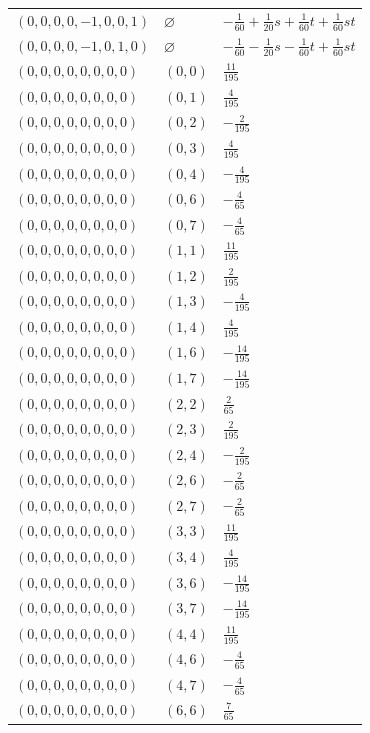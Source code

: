 \begin{longtable}{@{}lll@{}}
$(0,0,0,0,-1,0,0,1)$ & $\varnothing$ & $-\frac{1}{60}+\frac{1}{20}s+\frac{1}{60}t+\frac{1}{60}st$\\
$(0,0,0,0,-1,0,1,0)$ & $\varnothing$ & $-\frac{1}{60}-\frac{1}{20}s-\frac{1}{60}t+\frac{1}{60}st$\\
$(0,0,0,0,0,0,0,0)$ & $(0,0)$ & $\frac{11}{195}$\\
$(0,0,0,0,0,0,0,0)$ & $(0,1)$ & $\frac{4}{195}$\\
$(0,0,0,0,0,0,0,0)$ & $(0,2)$ & $-\frac{2}{195}$\\
$(0,0,0,0,0,0,0,0)$ & $(0,3)$ & $\frac{4}{195}$\\
$(0,0,0,0,0,0,0,0)$ & $(0,4)$ & $-\frac{4}{195}$\\
$(0,0,0,0,0,0,0,0)$ & $(0,6)$ & $-\frac{4}{65}$\\
$(0,0,0,0,0,0,0,0)$ & $(0,7)$ & $-\frac{4}{65}$\\
$(0,0,0,0,0,0,0,0)$ & $(1,1)$ & $\frac{11}{195}$\\
$(0,0,0,0,0,0,0,0)$ & $(1,2)$ & $\frac{2}{195}$\\
$(0,0,0,0,0,0,0,0)$ & $(1,3)$ & $-\frac{4}{195}$\\
$(0,0,0,0,0,0,0,0)$ & $(1,4)$ & $\frac{4}{195}$\\
$(0,0,0,0,0,0,0,0)$ & $(1,6)$ & $-\frac{14}{195}$\\
$(0,0,0,0,0,0,0,0)$ & $(1,7)$ & $-\frac{14}{195}$\\
$(0,0,0,0,0,0,0,0)$ & $(2,2)$ & $\frac{2}{65}$\\
$(0,0,0,0,0,0,0,0)$ & $(2,3)$ & $\frac{2}{195}$\\
$(0,0,0,0,0,0,0,0)$ & $(2,4)$ & $-\frac{2}{195}$\\
$(0,0,0,0,0,0,0,0)$ & $(2,6)$ & $-\frac{2}{65}$\\
$(0,0,0,0,0,0,0,0)$ & $(2,7)$ & $-\frac{2}{65}$\\
$(0,0,0,0,0,0,0,0)$ & $(3,3)$ & $\frac{11}{195}$\\
$(0,0,0,0,0,0,0,0)$ & $(3,4)$ & $\frac{4}{195}$\\
$(0,0,0,0,0,0,0,0)$ & $(3,6)$ & $-\frac{14}{195}$\\
$(0,0,0,0,0,0,0,0)$ & $(3,7)$ & $-\frac{14}{195}$\\
$(0,0,0,0,0,0,0,0)$ & $(4,4)$ & $\frac{11}{195}$\\
$(0,0,0,0,0,0,0,0)$ & $(4,6)$ & $-\frac{4}{65}$\\
$(0,0,0,0,0,0,0,0)$ & $(4,7)$ & $-\frac{4}{65}$\\
$(0,0,0,0,0,0,0,0)$ & $(6,6)$ & $\frac{7}{65}$\\

\end{longtable}
